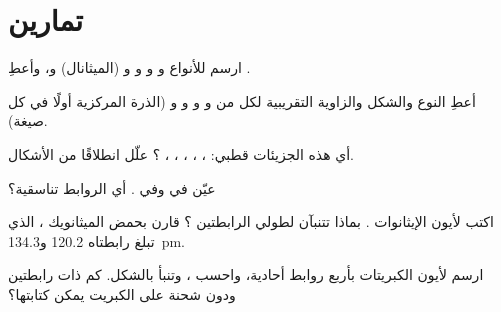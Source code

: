 \section{تمارين}

\begin{exercise}[$\star$]\label{exo:b1:lewis-resonance-vsepr:1}
ارسم  للأنواع  و و و
و (الميثانال) و، وأعطِ .
\end{exercise}

\begin{exercise}[$\star$]\label{exo:b1:lewis-resonance-vsepr:2}
أعطِ النوع  والشكل والزاوية التقريبية لكل من
 و و و و (الذرة المركزية
أولًا في كل صيغة).
\end{exercise}

\begin{exercise}[$\star$]\label{exo:b1:lewis-resonance-vsepr:3}
أي هذه الجزيئات قطبي: ، ، ،
، ، ؟ علّل انطلاقًا من الأشكال.
\end{exercise}

\begin{exercise}[$\star$]\label{exo:b1:lewis-resonance-vsepr:4}
عيّن   في 
وفي . أي الروابط تناسقية؟
\end{exercise}

\begin{exercise}[$\star\star$]\label{exo:b1:lewis-resonance-vsepr:5}
اكتب  لأيون الإيثانوات . بماذا
تتنبآن لطولي الرابطتين ؟ قارن بحمض
الميثانويك ، الذي تبلغ رابطتاه  120.2
و\qty{134.3}{pm}.
\end{exercise}

\begin{exercise}[$\star\star$]\label{exo:b1:lewis-resonance-vsepr:6}
ارسم  لأيون الكبريتات  بأربع
روابط  أحادية، واحسب ، وتنبأ
بالشكل. كم  ذات رابطتين  ودون
شحنة على الكبريت يمكن كتابتها؟
\end{exercise}


